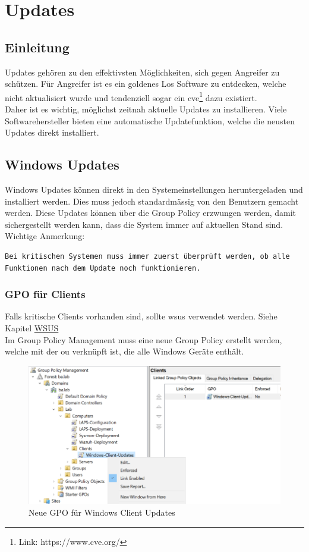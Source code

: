 \chapter{Updates}
\section{Einleitung}
Updates gehören zu den effektivsten Möglichkeiten, sich gegen Angreifer zu schützen.
Für Angreifer ist es ein goldenes Los Software zu entdecken, welche nicht aktualisiert wurde und tendenziell sogar ein \acrfull{cve}\footnote{Link: https://www.cve.org/} dazu existiert.\\

Daher ist es wichtig, möglichst zeitnah aktuelle Updates zu installieren.
Viele Softwarehersteller bieten eine automatische Updatefunktion, welche die neusten Updates direkt installiert.

\section{Windows Updates}
Windows Updates können direkt in den Systemeinstellungen heruntergeladen und installiert werden.
Dies muss jedoch standardmässig von den Benutzern gemacht werden.
Diese Updates können über die Group Policy erzwungen werden, damit sichergestellt werden kann, dass die System immer auf aktuellen Stand sind.\\

Wichtige Anmerkung:
\begin{lstlisting}
Bei kritischen Systemen muss immer zuerst überprüft werden, ob alle Funktionen nach dem Update noch funktionieren.
\end{lstlisting}

\subsection{GPO für Clients}
Falls kritische Clients vorhanden sind, sollte \acrfull{wsus} verwendet werden. Siehe Kapitel \hyperref[subsec:wsus]{WSUS}\\

Im Group Policy Management muss eine neue Group Policy erstellt werden, welche mit der \acrshort{ou} verknüpft ist, die alle Windows Geräte enthält.
\begin{figure}[H]
    \centering
    \includegraphics[width=0.7\linewidth]{../img/Updates/edit-gpo-clinets.png}
    \caption{Neue GPO für Windows Client Updates}
\end{figure}

